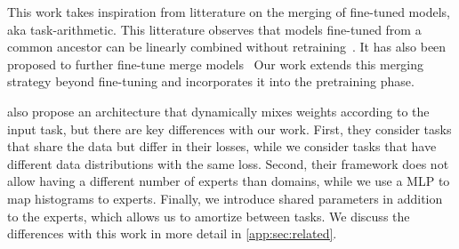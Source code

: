 This work takes inspiration from litterature on the merging of fine-tuned models, aka task-arithmetic. This litterature observes that models
fine-tuned from a common ancestor can be linearly combined without retraining~\cite{wortsman2022soups,ilharco2022editing,huang2023lorahub,ortiz2023tangent,tam2024realistic}. It has also been proposed to further fine-tune merge models~\cite{choshen2022fusing,rame2023ratatouille}
Our work extends this merging strategy beyond fine-tuning and incorporates it into the pretraining phase.  

\citep{dimitriadis2023pareto} also propose an architecture that dynamically mixes weights according to the input task, but there are key differences with our work. 
First, they consider tasks that share the data but differ in their losses, while we consider tasks that have different data distributions with the same loss.
Second, their framework does not allow having a different number of experts than domains, while we use a MLP to map histograms to experts.
Finally, we introduce shared parameters in addition to the experts, which allows us to amortize between tasks.
We discuss the differences with this work in more detail in \autoref{app:sec:related}.